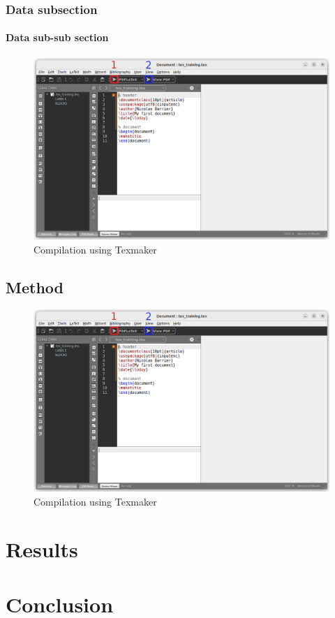 \documentclass[12pt]{book}
\begin{document}
\subsection{Data subsection}
\subsubsection{Data sub-sub section}
\lipsum[1-3]

\begin{figure}[h!]
    \centering
    \includegraphics[width=0.5\linewidth]{figs/texmaker-1.png}
    \caption{Compilation using Texmaker}
\end{figure}

\lipsum[4-7]

\section{Method}

\lipsum[1-5]

\begin{figure}[h!]
    \centering
    \includegraphics[width=0.5\linewidth]{figs/texmaker-1.png}
    \caption{Compilation using Texmaker}
\end{figure}

\lipsum[6-7]

\chapter{Results}
\minitoc

\chapter{Conclusion}
\minitoc
\end{document}
